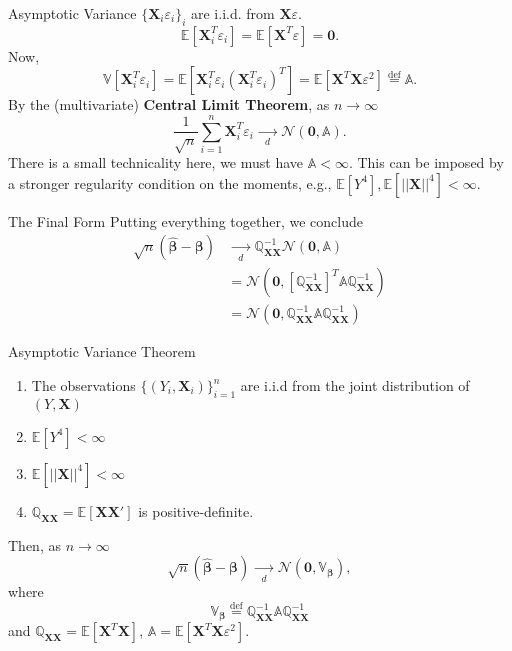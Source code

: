 \documentclass[12pt, block=fill]{beamer}
\newcommand{\E}[1]{\mathbb{E}\left[#1\right]}
\renewcommand{\v}[1]{\pmb{#1}}
\newcommand{\m}[1]{\mathbb{#1}}
\newcommand{\eps}{\varepsilon}
\begin{document}
\begin{frame}{Asymptotic Variance}
$\{\v{X}_i\eps_i\}_i$ are i.i.d. from $\v{X}\eps$. 
$$
\E{\v{X}_i^T\eps_i}=\E{\v{X}^T\eps}=\v{0}.
$$
Now, 
$$
\m{V}[\v{X}_i^T\eps_i]=\E{\v{X}_i^T\eps_i\left(\v{X}_i^T\eps_i\right)^T}=\E{\v{X}^T\v{X}\eps^2}\stackrel{\text{def}}{=}\m{A}.
$$
By the (multivariate) \textbf{Central Limit Theorem}, as $n\to\infty$
$$
\frac{1}{\sqrt{n}}\sum\limits_{i=1}^n\v{X}_i^T\eps_i
\xrightarrow[d]{\quad\quad}\mathcal{N}(\v{0},\m{A}).
$$
There is a small technicality here, we must have $\m{A}<\infty$. This can be imposed by a stronger regularity condition on the moments, e.g.,
$\E{Y^4},\E{||\v{X}||^4}<\infty$.
\end{frame}

\begin{frame}{The Final Form}
Putting everything together, we conclude
$$
\begin{aligned}
	\sqrt{n}(\widehat{\v{\beta}}-\v{\beta}) &\xrightarrow[d]{\quad\quad}
\m{Q}_{\v{XX}}^{-1}\mathcal{N}(\v{0},\m{A}) \\
&=\mathcal{N}\left(\v{0},\left[\m{Q}_{\v{XX}}^{-1}\right]^T\m{A}\m{Q}_{\v{XX}}^{-1}\right) \\
&=\mathcal{N}\left(\v{0},\m{Q}_{\v{XX}}^{-1}\m{A}\m{Q}_{\v{XX}}^{-1}\right)
\end{aligned}
$$
\end{frame}

\begin{frame}
\begin{block}{Asymptotic Variance Theorem}
\begin{enumerate}
\item The observations $\{(Y_i,\v{X}_i)\}_{i=1}^n$ are i.i.d from the joint
distribution of $(Y,\v{X})$  
\item $\E{Y^4}<\infty$  
\item $\E{||\v{X}||^4}<\infty$  
\item $\m{Q}_{\v{XX}}=\E{\v{X}\v{X}'}$ is positive-definite.
\end{enumerate}
Then, as $n\to\infty$
$$
\sqrt{n}(\widehat{\v{\beta}}-\v{\beta})\xrightarrow[d]{\quad\quad}
\mathcal{N}\left(\v{0},\m{V}_{\v{\beta}}\right),
$$
where 
$$\m{V}_{\v{\beta}}\stackrel{\text{def}}{=}\m{Q}_{\v{XX}}^{-1}\m{A}\m{Q}_{\v{XX}}^{-1}$$
and $\m{Q}_{\v{XX}}=\E{\v{X}^T\v{X}}$, $\m{A}=\E{\v{X}^T\v{X}\eps^2}$.
\end{block}
\end{frame}
\end{document}
